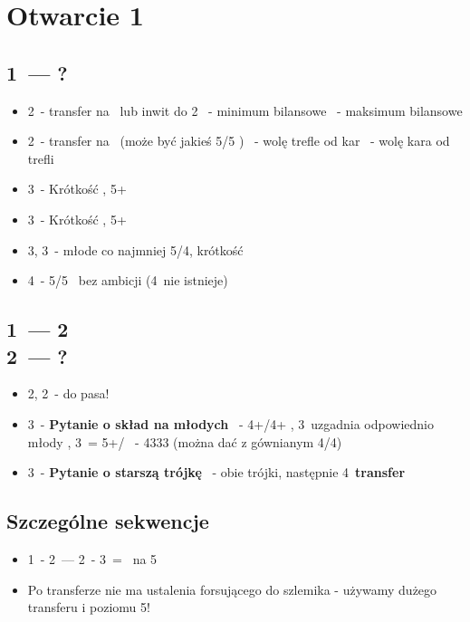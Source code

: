 \documentclass[12pt, a4paper]{article}
\begin{document}
\pagebreak
\section{Otwarcie 1\ntx}
\subsection{1\ntx\ --- ?}
\begin{itemize}
    \item 2\spades\ - transfer na \clubs\ lub inwit do 2\nt
    \nt\ - minimum bilansowe
    \clubs\ - maksimum bilansowe
    \item 2\nt\ - transfer na \diams\ (może być jakieś 5/5 \minor)
    \clubs\ - wolę trefle od kar
    \diams\ - wolę kara od trefli
    \item 3\clubs\ - Krótkość \clubs, 5+\diams
    \item 3\diams\ - Krótkość \diams, 5+\clubs
    \item 3\hearts, 3\spades\ - młode co najmniej 5/4, krótkość
    \item 4\clubs\ - 5/5 \major\ bez ambicji (4\diams\ nie istnieje)
\end{itemize}

\subsection{1\ntx\ --- 2\clubs \\ 2\diams\ --- ?}
\begin{itemize}
    \item 2\hearts, 2\spades\ - do pasa!
    \item 3\clubs\ - \textbf{Pytanie o skład na młodych}
    \diams\ - 4+/4+ \minor, 3\major\ uzgadnia odpowiednio młody
    \hearts, 3\spades\ = 5+\clubs/\diams
    \nt\ - 4333 (można dać z gównianym 4/4\minor)
    \item 3\diams\ - \textbf{Pytanie o starszą trójkę}
    \clubs\ - obie trójki, następnie 4\diams\hearts\ \textbf{transfer}
\end{itemize}

\subsection{Szczególne sekwencje}
\begin{itemize}
    \item 1\nt\ - 2\hearts\ --- 2\spades\ - 3\hearts\ = \inv\ na 5\hearts
    \item Po transferze nie ma ustalenia forsującego do szlemika - używamy dużego transferu i poziomu 5!
\end{itemize}
\end{document}
